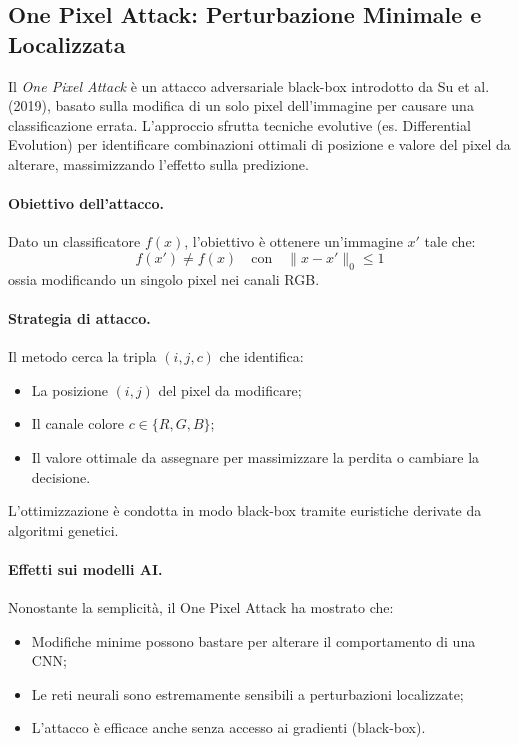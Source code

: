 \subsection{One Pixel Attack: Perturbazione Minimale e Localizzata}
\label{sec:one_pixel_attack}

Il \textit{One Pixel Attack} è un attacco adversariale black-box introdotto da Su et al. (2019), basato sulla modifica di un solo pixel dell’immagine per causare una classificazione errata. L’approccio sfrutta tecniche evolutive (es. Differential Evolution) per identificare combinazioni ottimali di posizione e valore del pixel da alterare, massimizzando l'effetto sulla predizione.

\paragraph{Obiettivo dell’attacco.}
Dato un classificatore $f(x)$, l’obiettivo è ottenere un’immagine $x'$ tale che:
\[
f(x') \neq f(x) \quad \text{con} \quad \|x - x'\|_0 \leq 1
\]
ossia modificando un singolo pixel nei canali RGB.

\paragraph{Strategia di attacco.}
Il metodo cerca la tripla $(i, j, c)$ che identifica:
\begin{itemize}
    \item La posizione $(i,j)$ del pixel da modificare;
    \item Il canale colore $c \in \{R, G, B\}$;
    \item Il valore ottimale da assegnare per massimizzare la perdita o cambiare la decisione.
\end{itemize}
L’ottimizzazione è condotta in modo black-box tramite euristiche derivate da algoritmi genetici.

\paragraph{Effetti sui modelli AI.}
Nonostante la semplicità, il One Pixel Attack ha mostrato che:
\begin{itemize}
    \item Modifiche minime possono bastare per alterare il comportamento di una CNN;
    \item Le reti neurali sono estremamente sensibili a perturbazioni localizzate;
    \item L’attacco è efficace anche senza accesso ai gradienti (black-box).
\end{itemize}

